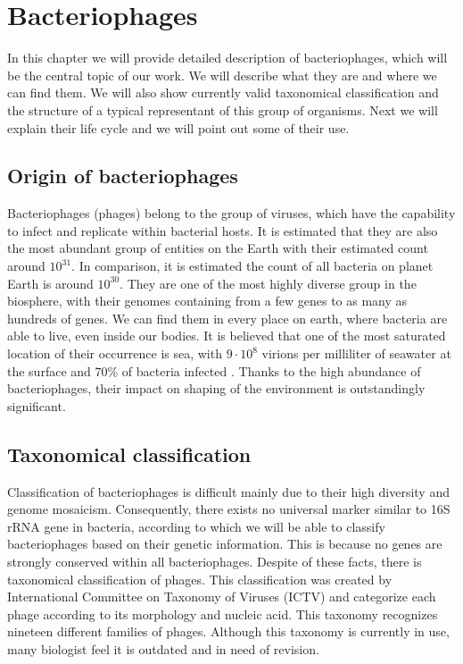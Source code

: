 \chapter{Bacteriophages}
In this chapter we will provide detailed description of bacteriophages, which will be the central topic of our work.
We will describe what they are and where we can find them.
We will also show currently valid taxonomical classification and the structure of a typical representant of this group of organisms.
Next we will explain their life cycle and we will point out some of their use.

\section{Origin of bacteriophages}
Bacteriophages (phages) belong to the group of viruses, which have the capability to infect and replicate within bacterial hosts.
It is estimated that they are also the most abundant group of entities on the Earth with their estimated count around $10^{31}$\cite{phage}.
In comparison, it is estimated the count of all bacteria on planet Earth is around $10^{30}$.
They are one of the most highly diverse group in the biosphere, with their genomes containing from a few genes to as many as hundreds of genes.
We can find them in every place on earth, where bacteria are able to live, even inside our bodies.
It is believed that one of the most saturated location of their occurrence is sea, with  $9\cdot 10^8$ virions per milliliter of seawater at the surface and 70\% of bacteria infected \cite{virioplankton}.
Thanks to the high abundance of bacteriophages, their impact on shaping of the environment is outstandingly significant.

\section{Taxonomical classification}
Classification of bacteriophages is difficult mainly due to their high diversity and genome mosaicism. \cite{phagetax}
Consequently, there exists no universal marker similar to 16S rRNA gene in bacteria, according to which we will be able to classify bacteriophages based on their genetic information.
This is because no genes are strongly conserved within all bacteriophages.
Despite of these facts, there is taxonomical classification of phages.
This classification was created by International Committee on Taxonomy of Viruses (ICTV) and categorize each phage according to its morphology and nucleic acid.
This taxonomy recognizes nineteen different families of phages.
Although this taxonomy is currently in use, many biologist feel it is outdated and in need of revision. \cite{phagetax}

